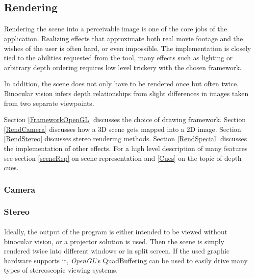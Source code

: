 \subsection{Rendering}
\paragraph{}
Rendering the scene into a perceivable image is one of the core jobs of the application.
Realizing effects that approximate both real movie footage and the wishes of the user is often hard, or even impossible.
The implementation is closely tied to the abilities requested from the tool, many effects such as lighting or arbitrary depth ordering requires low level trickery with the chosen framework.

In addition, the scene does not only have to be rendered once but often twice.
Binocular vision infers depth relationships from slight differences in images taken from two separate viewpoints.

Section \ref{FrameworkOpenGL} discusses the choice of drawing framework.
Section \ref{RendCamera} discusses how a 3D scene gets mapped into a 2D image.
Section \ref{RendStereo} discusses stereo rendering methods.
Section \ref{RendSpecial} discusses the implementation of other effects.
For a high level description of many features see section \ref{sceneRep} on scene representation and \ref{Cues} on the topic of depth cues.


\subsubsection{Camera\label{RendCamera}}
\paragraph{}

\subsubsection{Stereo\label{RendStereo}}
\paragraph{}
Ideally, the output of the program is either intended to be viewed without binocular vision, or a projector solution is used.
Then the scene is simply rendered twice into different windows or in split screen.
If the used graphic hardware supports it, \textit{OpenGL}'s QuadBuffering can be used to easily drive many types of stereoscopic viewing systems.

